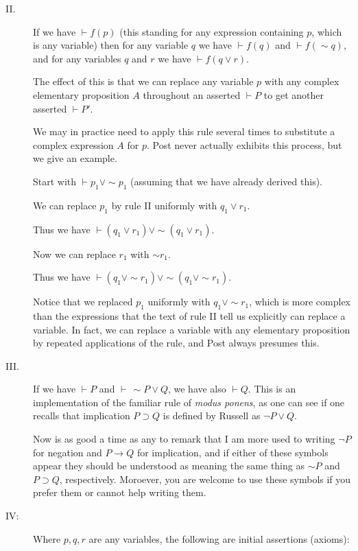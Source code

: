 \documentclass[12pt]{article}
\begin{document}
\begin{description}

\item[II.]  If we have $\vdash f(p)$ (this standing for any expression containing $p$, which is any variable) then for any variable $q$ we have $\vdash f(q)$ and $\vdash f(\sim q)$,
and for any variables $q$ and $r$ we have $\vdash f(q\vee r)$.

The effect of this is that we can replace any variable $p$ with any complex elementary proposition $A$ throughout an asserted $\vdash P$ to get another asserted $\vdash P'$.

We may in practice need to apply this rule several times to substitute a complex expression $A$ for $p$.  Post never actually exhibits this process, but we give an example.

Start with $\vdash p_1 \vee \sim p_1$ (assuming that we have already derived this).

We can replace $p_1$ by rule II uniformly with $q_1 \vee r_1$.

Thus we have $\vdash (q_1 \vee r_1) \vee \sim (q_1 \vee r_1)$.

Now we can replace $r_1$ with $ \sim r_1$.

Thus we have $\vdash (q_1 \vee \sim r_1) \vee \sim (q_1 \vee \sim r_1)$.

Notice that we replaced $p_1$ uniformly with $q_1 \vee \sim r_1$, which is more complex than the expressions that the text of rule II tell us explicitly can replace a variable.  In fact, we can replace a variable with any elementary proposition by repeated applications of the rule, and Post always presumes this.

\item[III.]  If we have $\vdash P$ and $\vdash\, \sim P \vee Q$, we have also $\vdash Q$.  This is an implementation of the familiar rule of {\em modus ponens\/}, as one can see if one recalls
that implication $P \supset Q$ is defined by Russell as $\neg P \vee Q$.

Now is as good a time as any to remark that I am more used to writing $\neg P$ for negation and $P \rightarrow Q$ for implication, and if either of these symbols appear they should be understood as meaning the same thing as $\sim P$ and $P \supset Q$, respectively.  Moroever, you are welcome to use these symbols if you prefer them or cannot help writing them.

\item [IV:]  Where $p,q,r$ are any variables, the following are initial assertions (axioms):


\end{description}
\end{document}
